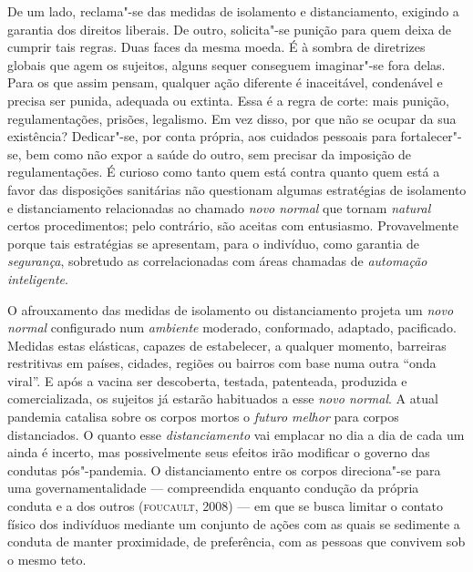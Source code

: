 De um lado, reclama"-se das medidas de isolamento e distanciamento,
exigindo a garantia dos direitos liberais. De outro, solicita"-se punição
para quem deixa de cumprir tais regras. Duas faces da mesma moeda. É à
sombra de diretrizes globais que agem os sujeitos, alguns sequer
conseguem imaginar"-se fora delas. Para os que assim pensam, qualquer
ação diferente é inaceitável, condenável e precisa ser punida, adequada
ou extinta. Essa é a regra de corte: mais punição, regulamentações,
prisões, legalismo. Em vez disso, por que não se ocupar da sua
existência? Dedicar"-se, por conta própria, aos cuidados pessoais para
fortalecer"-se, bem como não expor a saúde do outro, sem precisar da
imposição de regulamentações. É curioso como tanto quem está contra
quanto quem está a favor das disposições sanitárias não questionam
algumas estratégias de isolamento e distanciamento relacionadas ao
chamado \emph{novo normal} que tornam \emph{natural} certos
procedimentos; pelo contrário, são aceitas com entusiasmo. Provavelmente
porque tais estratégias se apresentam, para o indivíduo, como garantia
de \emph{segurança}, sobretudo as correlacionadas com áreas chamadas de
\emph{automação inteligente}.

O afrouxamento das medidas de isolamento ou distanciamento projeta um
\emph{novo normal} configurado num \emph{ambiente} moderado, conformado,
adaptado, pacificado. Medidas estas elásticas, capazes de estabelecer, a
qualquer momento, barreiras restritivas em países, cidades, regiões ou
bairros com base numa outra ``onda viral''. E após a vacina ser
descoberta, testada, patenteada, produzida e comercializada, os sujeitos
já estarão habituados a esse \emph{novo normal}. A atual pandemia
catalisa sobre os corpos mortos o \emph{futuro melhor} para corpos
distanciados. O quanto esse \emph{distanciamento} vai emplacar no dia a
dia de cada um ainda é incerto, mas possivelmente seus efeitos irão
modificar o governo das condutas pós"-pandemia. O distanciamento entre os
corpos direciona"-se para uma governamentalidade --- compreendida
enquanto condução da própria conduta e a dos outros (\textsc{foucault}, 2008) ---
em que se busca limitar o contato físico dos indivíduos mediante um
conjunto de ações com as quais se sedimente a conduta de manter
proximidade, de preferência, com as pessoas que convivem sob o mesmo
teto.

